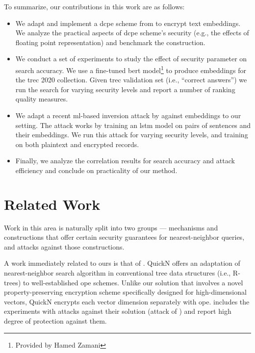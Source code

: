 		To summarize, our contributions in this work are as follows:
		\begin{itemize}
			\item
				We adapt and implement a \acrfull{dcpe} scheme from \cite{dcpe} to encrypt text embeddings.
				We analyze the practical aspects of \acrshort{dcpe} scheme's security (e.g., the effects of floating point representation) and benchmark the construction.

			\item
				We conduct a set of experiments to study the effect of security parameter on search accuracy.
				We use a fine-tuned \acrshort{bert} model\footnote{Provided by Hamed Zamani} to produce embeddings for the \acrshort{trec} 2020 collection.
				Given \acrshort{trec} validation set (i.e., ``correct answers'') we run the search for varying security levels and report a number of ranking quality measures.

			\item
				We adapt a recent \acrshort{ml}-based inversion attack by \textcite{embedding-attacks} against embeddings to our setting.
				The attack works by training an \acrshort{lstm} model on pairs of sentences and their embeddings.
				We run this attack for varying security levels, and training on both plaintext and encrypted records.

			\item
				Finally, we analyze the correlation results for search accuracy and attack efficiency and conclude on practicality of our method.
		\end{itemize}

	\section{Related Work}

		Work in this area is naturally split into two groups --- mechanisms and constructions that offer certain security guarantees for nearest-neighbor queries, and attacks against those constructions.

		A work immediately related to ours is that of \textcite{quick-n}.
		QuickN offers an adaptation of nearest-neighbor search algorithm in conventional tree data structures (i.e., R-trees) to well-established \acrfull{ope} schemes.
		Unlike our solution that involves a novel property-preserving encryption scheme specifically designed for high-dimensional vectors, QuickN encrypts each vector dimension separately with \acrshort{ope}.
		\cite{quick-n} includes the experiments with attacks against their solution (attack of \textcite{leakage-abuse-grubs-2017}) and report high degree of protection against them.

